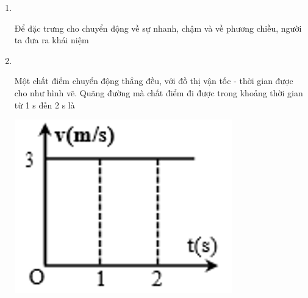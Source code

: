 \begin{enumerate}[label=\bfseries Câu \arabic*:,leftmargin=1.5cm]
{}

\item {}\\
{Để đặc trưng cho chuyển động về sự nhanh, chậm và về phương chiều, người ta đưa ra khái niệm
}

\item {}\\
{\begin{minipage}[l]{0.6\textwidth}
		Một chất điểm chuyển động thẳng đều, với đồ thị vận tốc - thời gian được cho như hình vẽ. Quãng đường mà chất điểm đi được trong khoảng thời gian từ 1 s đến 2 s là
	\end{minipage}
	\begin{minipage}{0.4\textwidth}
		\begin{center}
			\includegraphics[width=0.5\linewidth]{../figs/VN10-2022-PH-TP008-P-1}
		\end{center}
	\end{minipage}
}


\end{enumerate}
